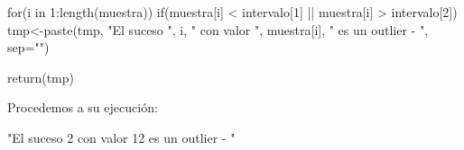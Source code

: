\documentclass [a4paper] {article}
\begin{document}
\begin{enumerate}
\begin{Schunk}
\begin{Soutput}
{    for(i in 1:length(muestra)){
        if(muestra[i] < intervalo[1] || muestra[i] > intervalo[2]){
            tmp<-paste(tmp, "El suceso ", i, " con valor ", muestra[i],
            " es un outlier - ", sep="")
        }
    }
    
    return(tmp)
}
\end{Soutput}
\end{Schunk}

\bigskip
Procedemos a su ejecución:
\begin{Schunk}
\begin{Soutput}
[1] "El suceso 2 con valor 12 es un outlier - "
\end{Soutput}
\end{Schunk}

\end{enumerate}
\end{document}
